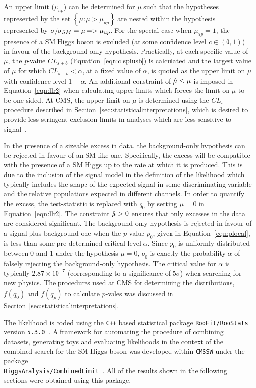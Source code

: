 An upper limit ($\mu_{up}$) can be determined for $\mu$ such that
the hypotheses represented by the set $\left\{ \mu:\mu>\mu_{up} \right\}$
are nested within the hypothesis represented by $\sigma/\sigma_{SM}=\mu=>\mu_{up}$.
For the special case when $\mu_{up}=1$, the presence of a SM Higgs boson is excluded
(at some confidence level $c\in(0,1)$) in favour of the background-only hypothesis.
Practically, at each specific value of $\mu$, the $p$-value $CL_{s+b}$ 
(Equation~\ref{eqn:clsplusb}) 
is calculated and the largest value of $\mu$ for which $CL_{s+b}<\alpha$,
at a fixed value of $\alpha$, is quoted as the upper limit on $\mu$ with confidence level 
$1-\alpha$. An additional constraint of $\hat{\mu} \le \mu$ is imposed in Equation~\ref{eqn:llr2} 
when calculating upper limits which forces the limit on $\mu$ to be one-sided.
At CMS, the upper limit on $\mu$ is determined using the $CL_{s}$
procedure described in Section~\ref{sec:statisticalinterpretations}, which is
desired to provide less stringent exclusion limits in analyses which are less sensitive
to signal~\citep{cls}. 

In the presence of a sizeable excess in data, the background-only hypothesis
can be rejected in favour of an SM like one. Specifically, the excess 
will be compatible with the presence of a SM Higgs up to the rate
at which it is produced. This is due to the inclusion of the signal model 
in the definition of the likelihood which typically includes the shape of 
the expected signal in some discriminating variable and the relative populations
expected in different channels.
In order to quantify the excess, the test-statistic
is replaced with $q_{0}$ by setting $\mu=0$ in Equation~\ref{eqn:llr2}.
The constraint $\hat{\mu}>0$ ensures that only excesses in the data are considered significant.
The background-only hypothesis is rejected in favour of a signal plus background one
when the $p$-value $p_{0}$, given in Equation~\ref{eqn:plocal},
is less than some pre-determined critical level $\alpha$.
Since $p_{0}$ is uniformly distributed between 0 and 1 under the hypothesis $\mu=0$,
$p_{0}$ is exactly the probability $\alpha$ of falsely rejecting the background-only hypothesis.
The critical value for $\alpha$ is typically $2.87\times10^{-7}$ (corresponding 
to a significance of $5\sigma$) when searching for new physics.  
The procedures used at CMS for determining the distributions, $f(q_{0})$ and $f(q_{\mu})$
to calculate $p$-vales was discussed in Section~\ref{sec:statisticalinterpretations}.

The likelihood is coded using the \texttt{C++} based 
statistical package \texttt{RooFit/RooStats} version \texttt{5.3.0}~\citep{roofit}. 
A framework for automating the procedure of combining datasets, generating toys
and evaluating likelihoods in the context of the combined search for the SM Higgs boson
was developed within \texttt{CMSSW} 
under the package \\
\texttt{HiggsAnalysis/CombinedLimit}~\citep{combinationstwiki}.
All of the results shown in the following sections were obtained using this package.

